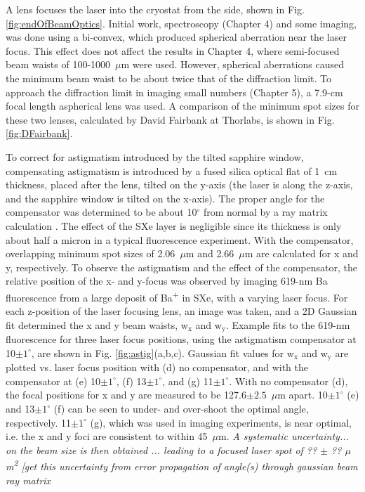 A lens focuses the laser into the cryostat from the side, shown in Fig. \ref{fig:endOfBeamOptics}.  Initial work, spectroscopy (Chapter 4) and some imaging, was done using a bi-convex, which produced spherical aberration near the laser focus.  This effect does not affect the results in Chapter 4, where semi-focused beam waists of 100-1000~$\mu$m were used.  However, spherical aberrations caused the minimum beam waist to be about twice that of the diffraction limit.  To approach the diffraction limit in imaging small numbers (Chapter 5), a 7.9-cm focal length aspherical lens was used.  A comparison of the minimum spot sizes for these two lenses, calculated by David Fairbank at Thorlabs, is shown in Fig. \ref{fig:DFairbank}.

To correct for astigmatism introduced by the tilted sapphire window, compensating astigmatism is introduced by a fused silica optical flat of 1~cm thickness, placed after the lens, tilted on the y-axis (the laser is along the z-axis, and the sapphire window is tilted on the x-axis).  The proper angle for the compensator was determined to be about 10$^{\circ}$ from normal by a ray matrix calculation \cite{raymatrix}.  The effect of the SXe layer is negligible since its thickness is only about half a micron in a typical fluorescence experiment.  With the compensator, overlapping minimum spot sizes of 2.06~$\mu$m and 2.66~$\mu$m are calculated for x and y, respectively.  To observe the astigmatism and the effect of the compensator, the relative position of the x- and y-focus was observed by imaging 619-nm Ba fluorescence from a large deposit of Ba\textsuperscript{+} in SXe, with a varying laser focus.  For each z-position of the laser focusing lens, an image was taken, and a 2D Gaussian fit determined the x and y beam waists, w$_{\text{x}}$ and w$_{\text{y}}$.  Example fits to the 619-nm fluorescence for three laser focus positions, using the astigmatism compensator at 10$\pm 1^{\circ}$, are shown in Fig. \ref{fig:astig}(a,b,c).  Gaussian fit values for w$_{\text{x}}$ and w$_{\text{y}}$ are plotted vs. laser focus position with (d) no compensator, and with the compensator at (e) 10$\pm 1^{\circ}$, (f) 13$\pm 1^{\circ}$, and (g) 11$\pm 1^{\circ}$.  With no compensator (d), the focal positions for x and y are measured to be 127.6$ \pm 2.5$~$\mu$m apart.  10$\pm 1^{\circ}$ (e) and 13$\pm 1^{\circ}$ (f) can be seen to under- and over-shoot the optimal angle, respectively.  11$\pm 1^{\circ}$ (g), which was used in imaging experiments, is near optimal, i.e. the x and y foci are consistent to within 45~$\mu$m.  \emph{\color{gray}A systematic uncertainty... on the beam size is then obtained ... leading to a focused laser spot of ?? $\pm$ ?? $\mu$m\textsuperscript{2} [get this uncertainty from error propagation of angle(s) through gaussian beam ray matrix}

